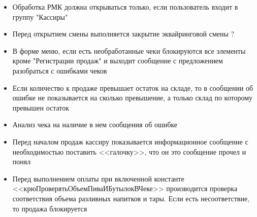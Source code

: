 \begin{itemize}
 	\item Обработка РМК должна открываться только, если пользователь входит в группу "Кассиры"
 	\item Перед открытием смены выполняется закрытие эквайринговой смены ?
 	\item В форме меню, если есть необработанные чеки блокируются все элементы кроме "Регистрации продаж" и выходит сообщение с предложением разобраться с ошибками чеков
 	\item Если количество к продаже превышает остаток на складе, то в сообщении об ошибке не показывается на сколько превышение, а только склад по которому превышен остаток
 	\item Анализ чека на наличие в нем сообщения об ошибке
	\item Перед началом продаж кассиру показывается информационное сообщение с необходимостью поставить <<галочку>>, что он это сообщение прочел и понял
    \item Перед выполнением оплаты при включенной константе <<крюПроверятьОбъемПиваИБутылокВЧеке>> производится проверка соответствия объема разливных напитков и тары. Если есть несоответствие, то продажа блокируется


\end{itemize}


